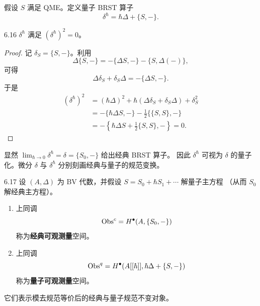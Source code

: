 假设 $S$ 满足 QME。定义量子 BRST 算子
\[
  \delta^\hbar = \hbar\Delta + \{S,-\}.
\]


\begin{wprop}{6.16}
  $\delta^\hbar$ 满足 $(\delta^\hbar)^2 = 0$。
\end{wprop}

\begin{proof}
  记 $\delta_S = \{S,-\}$。利用
  \[
    \Delta\{S,-\} = -\{\Delta S,-\} - \{S,\Delta(-)\},
  \]
  可得
  \[
    \Delta\delta_S + \delta_S\Delta = -\{\Delta S,-\}.
  \]
  于是
  \[
    \begin{aligned}
      (\delta^\hbar)^2 &= (\hbar\Delta)^2 + \hbar(\Delta\delta_S + \delta_S\Delta) + \delta_S^2\\
      &= -\{\hbar\Delta S,-\} - \frac{1}{2}\{\{S,S\},-\}\\
      &= -\left\{\hbar\Delta S + \frac{1}{2}\{S,S\},-\right\} = 0.
    \end{aligned}
  \]
\end{proof}


显然 $\lim_{\hbar\to0}\delta^\hbar = \delta = \{S_0,-\}$ 给出经典 BRST 算子。
因此 $\delta^\hbar$ 可视为 $\delta$ 的量子化。微分 $\delta$ 与 $\delta^\hbar$
分别刻画经典与量子的规范变换。

\begin{wdefn}{6.17}
  设 $(A,\Delta)$ 为 BV 代数，并假设 $S = S_0 + \hbar S_1 + \cdots$ 解量子主方程
  （从而 $S_0$ 解经典主方程）。
  \begin{enumerate}[label=\textcircled{\small\arabic*},leftmargin=2.4em,itemsep=0.2em]
    \item 上同调
          \[
            \operatorname{Obs}^c = H^\bullet(A,\{S_0,-\})
          \]
          称为\textbf{经典可观测量}空间。
    \item 上同调
          \[
            \operatorname{Obs}^q = H^\bullet(A[[\hbar]],\hbar\Delta+\{S,-\})
          \]
          称为\textbf{量子可观测量}空间。
  \end{enumerate}
  它们表示模去规范等价后的经典与量子规范不变对象。
\end{wdefn}

